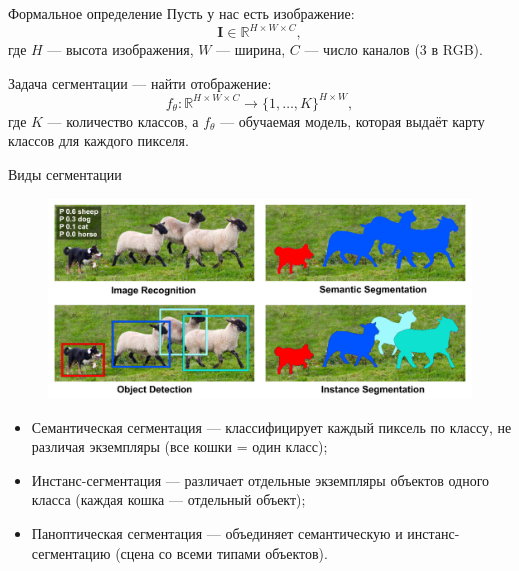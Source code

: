 \documentclass[notheorems, handout]{beamer}
\begin{document}
\begin{frame}{Формальное определение}
    Пусть у нас есть изображение:
    \[
        \mathbf{I} \in \mathbb{R} ^{H \times W \times C},
    \]
    где $H$ --- высота изображения, $W$ --- ширина, $C$ --- число каналов ($3$ в RGB).

    Задача сегментации --- найти отображение:
    \[
        f _\theta: \mathbb{R} ^{H \times W \times C} \to \{1, \dots, K\} ^{H \times W},
    \]
    где $K$ --- количество классов, а $f _\theta$ --- обучаемая модель, которая выдаёт карту классов для каждого пикселя.
\end{frame}

\begin{frame}{Виды сегментации}
    \begin{figure}
        \includegraphics[width=0.7\linewidth]{img/segmentation_kind.png}        
    \end{figure}
    \begin{itemize}
        \item Семантическая сегментация --- классифицирует каждый пиксель по классу, не различая экземпляры (все кошки = один класс);
        \item Инстанс-сегментация --- различает отдельные экземпляры объектов одного класса (каждая кошка — отдельный объект);
        \item Паноптическая сегментация --- объединяет семантическую и инстанс-сегментацию (сцена со всеми типами объектов).
    \end{itemize}
\end{frame}
\end{document}
